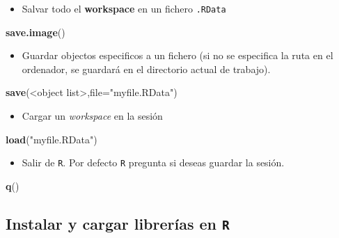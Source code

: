 \documentclass[]{article}
\def\tightlist{}
\newenvironment{Shaded}{\begin{snugshade}}{\end{snugshade}}
\newcommand{\KeywordTok}[1]{\textcolor[rgb]{0.13,0.29,0.53}{\textbf{{#1}}}}
\newcommand{\DataTypeTok}[1]{\textcolor[rgb]{0.13,0.29,0.53}{{#1}}}
\newcommand{\StringTok}[1]{\textcolor[rgb]{0.31,0.60,0.02}{{#1}}}
\newcommand{\NormalTok}[1]{{#1}}
\numberwithin{equation}{section}
\begin{document}
\begin{itemize}
\tightlist
\item
  Salvar todo el \textbf{workspace} en un fichero \texttt{.RData}
\end{itemize}

\begin{Shaded}
\begin{Highlighting}[]
\KeywordTok{save.image}\NormalTok{()}
\end{Highlighting}
\end{Shaded}

\begin{itemize}
\tightlist
\item
  Guardar objectos especificos a un fichero (si no se especifica la ruta
  en el ordenador, se guardará en el directorio actual de trabajo).
\end{itemize}

\begin{Shaded}
\begin{Highlighting}[]
\KeywordTok{save}\NormalTok{(<object list>,}\DataTypeTok{file=}\StringTok{"myfile.RData"}\NormalTok{) }
\end{Highlighting}
\end{Shaded}

\begin{itemize}
\tightlist
\item
  Cargar un \emph{workspace} en la sesión
\end{itemize}

\begin{Shaded}
\begin{Highlighting}[]
\KeywordTok{load}\NormalTok{(}\StringTok{"myfile.RData"}\NormalTok{) }
\end{Highlighting}
\end{Shaded}

\begin{itemize}
\tightlist
\item
  Salir de \texttt{R}. Por defecto \texttt{R} pregunta si deseas guardar
  la sesión.
\end{itemize}

\begin{Shaded}
\begin{Highlighting}[]
\KeywordTok{q}\NormalTok{()}
\end{Highlighting}
\end{Shaded}

\subsection{\texorpdfstring{Instalar y cargar librerías en
\texttt{R}}{Instalar y cargar librerías en R}}\label{instalar-y-cargar-librerias-en-r}
\end{document}
